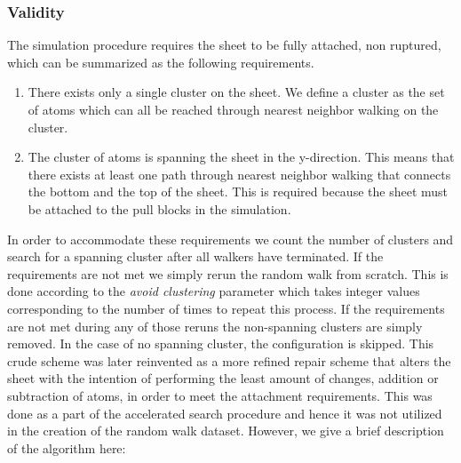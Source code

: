 \subsubsection{Validity}
The simulation procedure requires the sheet to be fully attached, non ruptured, which can be summarized as the following requirements. 
\begin{enumerate}
  \item There exists only a single cluster on the sheet. We define a cluster as the set of atoms which can all be reached through nearest neighbor walking on the cluster.
  \item The cluster of atoms is spanning the sheet in the y-direction. This means that there exists at least one path through nearest neighbor walking that connects the bottom and the top of the sheet. This is required because the sheet must be attached to the pull blocks in the simulation.
\end{enumerate}
In order to accommodate these requirements we count the number of clusters and search for a spanning cluster after all walkers have terminated. If the requirements are not met we simply rerun the random walk from scratch. This is done according to the \textit{avoid clustering} parameter which takes integer values corresponding to the number of times to repeat this process. If the requirements are not met during any of those reruns the non-spanning clusters are simply removed. In the case of no spanning cluster, the configuration is skipped. This crude scheme was later reinvented as a more refined repair scheme that alters the sheet with the intention of performing the least amount of changes, addition or subtraction of atoms, in order to meet the attachment requirements. This was done as a part of the accelerated search procedure and hence it was not utilized in the creation of the random walk dataset. However, we give a brief description of the algorithm here:
